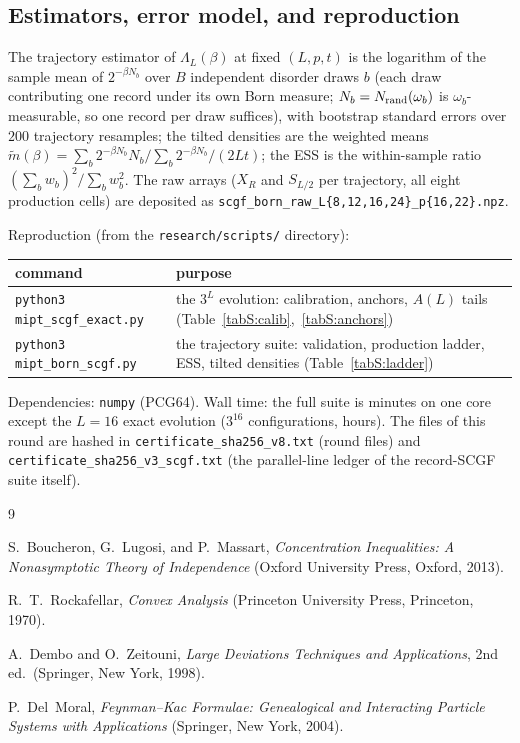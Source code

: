 \documentclass[aps,prx,reprint,superscriptaddress,nobibnotes,longbibliography]{revtex4-2}
\begin{document}
\subsection{Estimators, error model, and reproduction}

The trajectory estimator of $\Lambda_L(\beta)$ at fixed $(L,p,t)$ is the
logarithm of the sample mean of $2^{-\beta N_b}$ over $B$ independent
disorder draws $b$ (each draw contributing one record under its own Born
measure; $N_b=N_{\rm rand}(\omega_b)$ is $\omega_b$-measurable, so one
record per draw suffices), with bootstrap standard errors over $200$
trajectory resamples; the tilted densities are the weighted means
$\tilde m(\beta)=\sum_b2^{-\beta N_b}N_b/\sum_b2^{-\beta N_b}/(2Lt)$; the
ESS is the within-sample ratio
$(\sum_bw_b)^2/\sum_bw_b^2$.  The raw arrays ($X_R$ and $S_{L/2}$ per
trajectory, all eight production cells) are deposited as
\texttt{scgf\_born\_raw\_L\{8,12,16,24\}\_p\{16,22\}.npz}.

Reproduction (from the \texttt{research/scripts/} directory):
\begin{center}
\begin{tabular}{ll}
command & purpose\\
\hline
\texttt{python3 mipt\_scgf\_exact.py} & the $3^L$ evolution: calibration,
anchors, $A(L)$ tails (Table~\ref{tabS:calib},~\ref{tabS:anchors})\\
\texttt{python3 mipt\_born\_scgf.py} & the trajectory suite: validation,
production ladder, ESS, tilted densities
(Table~\ref{tabS:ladder})\\
\end{tabular}
\end{center}
Dependencies: \texttt{numpy} (PCG64).  Wall time: the full suite is
minutes on one core except the $L=16$ exact evolution ($3^{16}$
configurations, hours).  The files of this round are hashed in
\texttt{certificate\_sha256\_v8.txt} (round files) and
\texttt{certificate\_sha256\_v3\_scgf.txt} (the parallel-line ledger of
the record-SCGF suite itself).

\begin{thebibliography}{9}

 S.~Boucheron, G.~Lugosi, and P.~Massart,
\emph{Concentration Inequalities: A Nonasymptotic Theory of Independence}
(Oxford University Press, Oxford, 2013).

 R.~T.~Rockafellar, \emph{Convex Analysis}
(Princeton University Press, Princeton, 1970).

 A.~Dembo and O.~Zeitouni, \emph{Large
Deviations Techniques and Applications}, 2nd ed.\ (Springer, New York,
1998).

 P.~Del~Moral, \emph{Feynman--Kac Formulae:
Genealogical and Interacting Particle Systems with Applications}
(Springer, New York, 2004).

\end{thebibliography}
\end{document}

